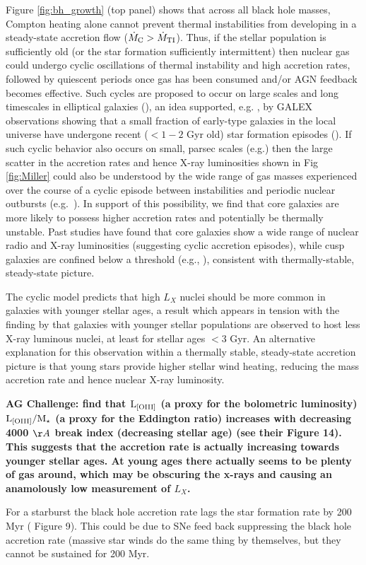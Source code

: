 \documentclass[usenatbib,fleqn]{mn2e}
\begin{document}
Figure \ref{fig:bh_growth} (top panel) shows that across all black hole masses, Compton heating alone cannot prevent thermal instabilities from developing in a steady-state accretion flow ($\dot{M}_{\rm C} > \dot{M}_{\rm TI}$).  Thus, if the stellar population is sufficiently old (or the star formation sufficiently intermittent) then nuclear gas could undergo cyclic oscillations of thermal instability and high accretion rates, followed by quiescent periods once gas has been consumed and/or AGN feedback becomes effective.  Such cycles are proposed to occur on large scales and long timescales in elliptical galaxies (\citealt{Ciotti+10}), an idea supported, e.g. , by GALEX observations showing that a small fraction of early-type galaxies in the local universe have undergone recent ($< 1-2$ Gyr old) star formation episodes (\citealt{Donas+07}).  If such cyclic behavior also occurs on small, parsec scales (e.g.) then the large scatter in the accretion rates and hence X-ray luminosities shown in Fig \ref{fig:Miller} could also be understood by the wide range of gas masses experienced over the course of a cyclic episode between instabilities and periodic nuclear outbursts (e.g.~\citealt{Ciotti+10}).  In support of this possibility, we find that core galaxies are more likely to possess higher accretion rates and potentially be thermally unstable.  Past studies have found that core galaxies show a wide range of nuclear radio and X-ray luminosities (suggesting cyclic accretion episodes), while cusp galaxies are confined below a threshold (e.g., \citealt{Bender+89, Pellegrini99, Capetti&Balmaverde05}), consistent with thermally-stable, steady-state picture.  

The cyclic model predicts that high $L_{X}$ nuclei should be more
common in galaxies with younger stellar ages, a result which appears
in tension with the finding by \citet{Pellegrini10} that galaxies with
younger stellar populations are observed to host less X-ray luminous
nuclei, at least for stellar ages $<3$ Gyr.  An alternative
explanation for this observation within a thermally stable,
steady-state accretion picture is that young stars provide higher
stellar wind heating, reducing the mass accretion rate and hence
nuclear X-ray luminosity.  {\bf AG Challenge: \citet{HeckmanBest:2014a}
  find that ${\rm L_{[OIII]}}$ (a proxy for the bolometric luminosity)
  ${\rm L_{[OIII]}/M_\star}$ (a proxy for the Eddington ratio)
  increases with decreasing 4000 $\AA$ break index (decreasing stellar
  age) (see their Figure 14). This suggests that the accretion rate is
  actually increasing towards younger stellar ages. At young ages
  there actually seems to be plenty of gas around, which may be
  obscuring the x-rays and causing an anamolously low measurement of
  $L_X$. 
  
  For a starburst the black hole accretion rate lags the star
  formation rate by 200 Myr (\citet{WildHeckman+:2010a} Figure
  9). This could be due to SNe feed back suppressing the black hole
  accretion rate (massive star winds do the same thing by themselves,
  but they cannot be sustained for 200 Myr. 
}
\end{document}
